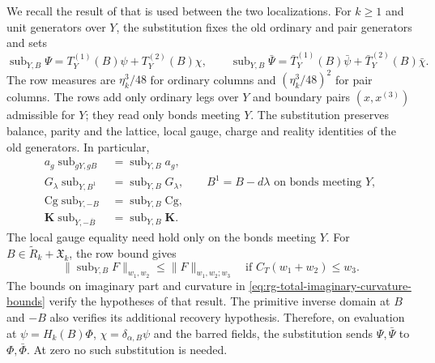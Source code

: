 \documentclass[11pt,letterpaper,reqno]{amsart}
\begin{document}
We recall the result of \cite[Theorem~B(iii)--(iv)]{NormalizedContraction}
that is used between the two localizations. For $k\ge1$ and unit
generators over $Y$, the substitution fixes the old ordinary and
pair generators and sets
\begin{equation}\label{eq:rg-step-local-substitution}
 \operatorname{sub}_{Y,B}\Psi=T_Y^{(1)}(B)\psi+T_Y^{(2)}(B)\chi,
 \qquad
 \operatorname{sub}_{Y,B}\bar\Psi=
              \bar T_Y^{(1)}(B)\bar\psi+\bar T_Y^{(2)}(B)\bar\chi.
\end{equation}
The row measures are $\eta_k^3/48$ for ordinary columns and
$(\eta_k^3/48)^2$ for pair columns. The rows add only ordinary
legs over $Y$ and boundary pairs $(x,x^{(3)})$ admissible for $Y$;
they read only bonds meeting $Y$. The substitution preserves
balance, parity and the lattice, local gauge, charge and reality
identities of the old generators. In particular,
\begin{equation}\label{eq:rg-step-substitution-covariances}
 \begin{split}
 a_g\operatorname{sub}_{gY,gB}
                        &=\operatorname{sub}_{Y,B}a_g,\\
 G_\lambda\operatorname{sub}_{Y,B^1}
                        &=\operatorname{sub}_{Y,B}G_\lambda,
                 \qquad B^1=B-d\lambda\text{ on bonds meeting }Y,\\
 \mathrm{Cg}\operatorname{sub}_{Y,-B}
                        &=\operatorname{sub}_{Y,B}\mathrm{Cg},\\
 \mathbf K\operatorname{sub}_{Y,-\overline B}
                        &=\operatorname{sub}_{Y,B}\mathbf K.
 \end{split}
\end{equation}
The local gauge equality need hold only on the bonds meeting $Y$.
For $B\in\widetilde R_k+\mathfrak X_k$, the row bound gives
\begin{equation}\label{eq:rg-step-substitution-bound}
 \|\operatorname{sub}_{Y,B}F\|_{w_1,w_2}
       \le\|F\|_{w_1,w_2;w_3}
       \quad\text{if }C_T(w_1+w_2)\le w_3.
\end{equation}
The bounds on imaginary part and curvature in
\eqref{eq:rg-total-imaginary-curvature-bounds} verify the hypotheses
of that result. The primitive inverse domain at $B$ and $-B$
also verifies its additional recovery hypothesis. Therefore, on
evaluation at $\psi=H_k(B)\Phi$, $\chi=\delta_{\alpha,B}\psi$ and
the barred fields, the substitution sends $\Psi,\bar\Psi$ to
$\Phi,\bar\Phi$. At zero no such substitution is needed.
\end{document}
